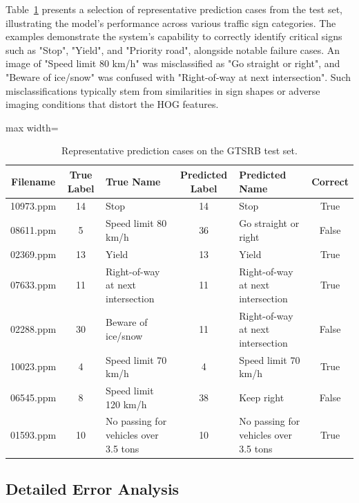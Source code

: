 \documentclass[11pt,a4paper,twoside]{article}
\begin{document}
Table~\ref{tab:representative_prediction_cases} presents a selection of representative prediction cases from the test set, illustrating the model's performance across various traffic sign categories. The examples demonstrate the system's capability to correctly identify critical signs such as "Stop", "Yield", and "Priority road", alongside notable failure cases. An image of "Speed limit 80 km/h" was misclassified as "Go straight or right", and "Beware of ice/snow" was confused with "Right-of-way at next intersection". Such misclassifications typically stem from similarities in sign shapes or adverse imaging conditions that distort the HOG features.

\begin{table}[H]
    \centering
    \scriptsize
    \setlength{\tabcolsep}{4.0pt}
    \renewcommand{\arraystretch}{1.1}
    \begin{adjustbox}{max width=\linewidth}
    \begin{tabular}{c c p{4.0cm} c p{4.0cm} c}
    \toprule
    \textbf{Filename} & \textbf{True Label} & \textbf{True Name} & \textbf{Predicted Label} & \textbf{Predicted Name} & \textbf{Correct} \\
    \midrule
    10973.ppm & 14 & Stop & 14 & Stop & True \\
    08611.ppm & 5 & Speed limit 80 km/h & 36 & Go straight or right & False \\
    02369.ppm & 13 & Yield & 13 & Yield & True \\
    07633.ppm & 11 & Right-of-way at next intersection & 11 & Right-of-way at next intersection & True \\
    02288.ppm & 30 & Beware of ice/snow & 11 & Right-of-way at next intersection & False \\
    10023.ppm & 4 & Speed limit 70 km/h & 4 & Speed limit 70 km/h & True \\
    06545.ppm & 8 & Speed limit 120 km/h & 38 & Keep right & False \\
    01593.ppm & 10 & No passing for vehicles over 3.5 tons & 10 & No passing for vehicles over 3.5 tons & True \\
    \bottomrule
    \end{tabular}
    \end{adjustbox}
    \caption{Representative prediction cases on the GTSRB test set.}
    \label{tab:representative_prediction_cases}
\end{table}

\subsection{Detailed Error Analysis}
\end{document}
